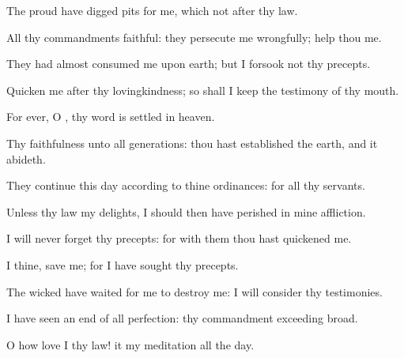 {\Q {}The
proud have
digged
pits for me, which
{} not after thy
law.


\par }{\Q {}All thy
commandments
{}
faithful: they
persecute me
wrongfully;
help thou me.


\par }{\Q {}They had
almost
consumed me upon
earth; but I
forsook not thy
precepts.


\par }{\Q {}Quicken me after thy
lovingkindness; so shall I
keep the
testimony of thy
mouth.


\par }{\BB \par }
{
\par }
{\Q {}For
ever, O
{}, thy
word is
settled in
heaven.


\par }{\Q {}Thy
faithfulness
{} unto
all
generations: thou hast
established the
earth, and it
abideth.


\par }{\Q {}They
continue this
day according to thine
ordinances: for all
{} thy
servants.


\par }{\Q {}Unless thy
law
{} my
delights, I should then have
perished in mine
affliction.


\par }{\Q {}I will
never
forget thy
precepts: for with them thou hast
quickened me.


\par }{\Q {}I
{} thine,
save me; for I have
sought thy
precepts.


\par }{\Q {}The
wicked have
waited for me to
destroy me:
{} I will
consider thy
testimonies.


\par }{\Q {}I have
seen an
end of all
perfection:
{} thy
commandment
{}
exceeding
broad.


\par }{
\par }
{\Q {}O how love
I thy
law! it
{} my
meditation all the
day.


\par }{\BB \par }

